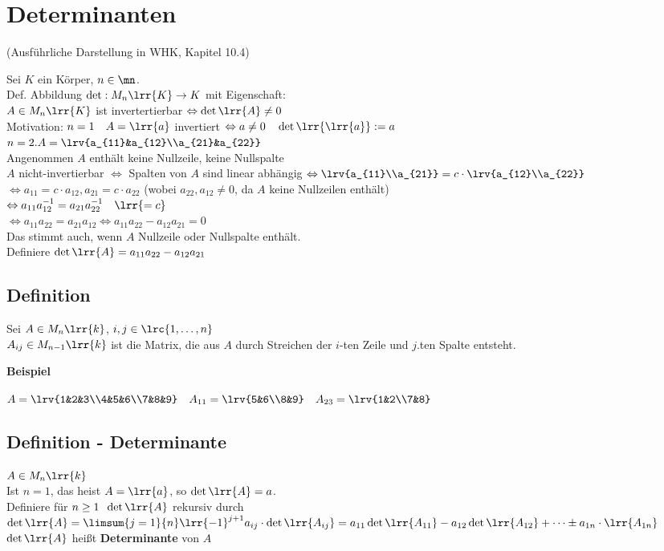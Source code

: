 \newpage
\section{Determinanten}
	(Ausführliche Darstellung in WHK, Kapitel 10.4)

	Sei $K$ ein Körper, $n\in\mn$.\\
	Def. Abbildung $\det:M_n\lrr{K}\rightarrow K$ mit Eigenschaft:\\
	$A\in M_n\lrr{K}$ ist invertertierbar $\Leftrightarrow\det\lrr{A}\neq 0$\\
	Motivation: $n=1\quad A=\lrr{a}$ invertiert $\Leftrightarrow a\neq 0\quad\det\lrr{\lrr{a}}:=a$\\
	$n=2. A=\lrv{a_{11}&a_{12}\\a_{21}&a_{22}}$\\
	Angenommen $A$ enthält keine Nullzeile, keine Nullspalte\\
	$A$ nicht-invertierbar $\Leftrightarrow$ Spalten von $A$ sind linear abhängig $\Leftrightarrow\lrv{a_{11}\\a_{21}}=c\cdot\lrv{a_{12}\\a_{22}}$\\
	$\Leftrightarrow a_{11}=c\cdot a_{12}, a_{21}=c\cdot a_{22}$ (wobei $a_{22},a_{12}\neq 0$, da $A$ keine Nullzeilen enthält)\\
	$\Leftrightarrow a_{11}a_{12}^{-1}=a_{21}a_{22}^{-1}\quad \lrr{=c}$\\
	$\Leftrightarrow a_{11}a_{22}=a_{21}a_{12}\Leftrightarrow a_{11}a_{22}-a_{12}a_{21}=0$\\
	Das stimmt auch, wenn $A$ Nullzeile oder Nullspalte enthält.\\
	Definiere $\det\lrr{A}=a_{11}a_{22}-a_{12}a_{21}$

\subsection{Definition}
	Sei $A\in M_n\lrr{k}$, $i,j\in\lrc{1,\dots,n}$\\
	$A_{ij}\in M_{n-1}\lrr{k}$ ist die Matrix, die aus $A$ durch Streichen der $i$-ten Zeile und $j$.ten Spalte entsteht.

	\textbf{Beispiel}

	$A=\lrv{1&2&3\\4&5&6\\7&8&9}\quad A_{11}=\lrv{5&6\\8&9}\quad A_{23}=\lrv{1&2\\7&8}$

\subsection{Definition - Determinante}
	$A\in M_n\lrr{k}$\\
	Ist $n=1$, das heist $A=\lrr{a}$, so $\det\lrr{A}=a$.\\
	Definiere für $n\geq 1 \;\; \det\lrr{A}$ rekursiv durch\\
  $\det\lrr{A}=\limsum{j=1}{n}\lrr{-1}^{j+1}a_{ij}\cdot\det\lrr{A_{ij}}=a_{11}\det\lrr{A_{11}}-a_{12}\det\lrr{A_{12}}+\dots\pm
  a_{1n}\cdot\lrr{A_{1n}}$\\
	$\det\lrr{A}$ heißt \textbf{Determinante} von $A$

